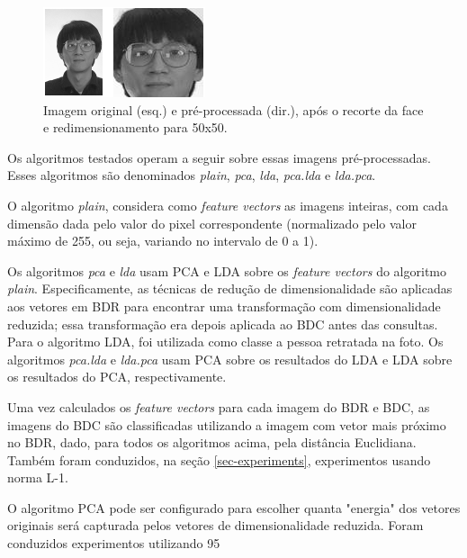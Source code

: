 \documentclass[10pt,twocolumn,letterpaper]{article}
\begin{document}
\begin{figure}
\begin{center}
	\includegraphics[width=0.99\columnwidth]{pics/cropping.png}
	\caption{Imagem original (esq.) e pré-processada (dir.), após o recorte da face e redimensionamento para 50x50.}
	\label{fig-cropping}   
\end{center} 
\end{figure}  

Os algoritmos testados operam a seguir sobre essas imagens pré-processadas. Esses algoritmos são denominados \emph{plain}, \emph{pca}, \emph{lda}, \emph{pca.lda} e \emph{lda.pca}.

O algoritmo \emph{plain}, considera como \emph{feature vectors} as imagens inteiras, com cada dimensão dada pelo valor do pixel correspondente (normalizado pelo valor máximo de 255, ou seja, variando no intervalo de 0 a 1).

Os algoritmos \emph{pca} e \emph{lda} usam PCA e LDA sobre os \emph{feature vectors} do algoritmo \emph{plain}. Especificamente, as técnicas de redução de dimensionalidade são aplicadas aos vetores em BDR para encontrar uma transformação com dimensionalidade reduzida; essa transformação era depois aplicada ao BDC antes das consultas. Para o algoritmo LDA, foi utilizada como classe a pessoa retratada na foto. Os algoritmos \emph{pca.lda} e \emph{lda.pca} usam PCA sobre os resultados do LDA e LDA sobre os resultados do PCA, respectivamente.

Uma vez calculados os  \emph{feature vectors} para cada imagem do BDR e BDC, as imagens do BDC são classificadas utilizando a imagem com vetor mais próximo no BDR, dado, para todos os algoritmos acima, pela distância Euclidiana. Também foram conduzidos, na seção \ref{sec-experiments}, experimentos usando norma L-1.

O algoritmo PCA pode ser configurado para escolher quanta "energia" dos vetores originais será capturada pelos vetores de dimensionalidade reduzida. Foram conduzidos experimentos utilizando 95%
\end{document}
